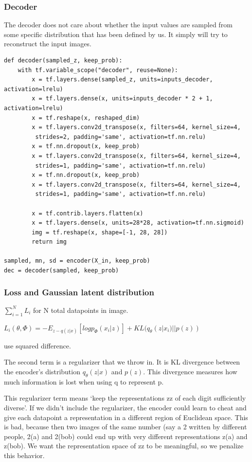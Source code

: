 \documentclass[a4paper]{article}
\begin{document}
\subsubsection{Decoder}
The decoder does not care about whether the input values are sampled from some specific distribution that has been defined by us. It simply will try to reconstruct the input images.
\begin{verbatim}
def decoder(sampled_z, keep_prob):
    with tf.variable_scope("decoder", reuse=None):
        x = tf.layers.dense(sampled_z, units=inputs_decoder, activation=lrelu)
        x = tf.layers.dense(x, units=inputs_decoder * 2 + 1, activation=lrelu)
        x = tf.reshape(x, reshaped_dim)
        x = tf.layers.conv2d_transpose(x, filters=64, kernel_size=4,
         strides=2, padding='same', activation=tf.nn.relu)
        x = tf.nn.dropout(x, keep_prob)
        x = tf.layers.conv2d_transpose(x, filters=64, kernel_size=4,
         strides=1, padding='same', activation=tf.nn.relu)
        x = tf.nn.dropout(x, keep_prob)
        x = tf.layers.conv2d_transpose(x, filters=64, kernel_size=4,
         strides=1, padding='same', activation=tf.nn.relu)
        
        x = tf.contrib.layers.flatten(x)
        x = tf.layers.dense(x, units=28*28, activation=tf.nn.sigmoid)
        img = tf.reshape(x, shape=[-1, 28, 28])
        return img

sampled, mn, sd = encoder(X_in, keep_prob)
dec = decoder(sampled, keep_prob)
\end{verbatim}

\subsubsection{Loss and Gaussian latent distribution}
$\sum_{i=1}^N L_i$ for N total datapoints in image.

$L_i(\theta,\Phi) = -E_{z-q(z|x)}[logp_\Phi(x_i|z)]+KL(q_\theta(z|x_i)||p(z))$

use squared difference.

The second term is a regularizer that we throw in. It is KL divergence between the encoder's distribution $q_\theta(z|x)$ and $p(z)$. This divergence measures how much information is lost when using q to represent p.

This regularizer term means ‘keep the representations zz of each digit sufficiently diverse’. If we didn’t include the regularizer, the encoder could learn to cheat and give each datapoint a representation in a different region of Euclidean space. This is bad, because then two images of the same number (say a 2 written by different people, 2(a) and 2(bob) could end up with very different representations z(a) and z(bob). We want the representation space of zz to be meaningful, so we penalize this behavior. 
\end{document}
